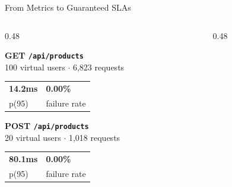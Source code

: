 \begin{frame}{From Metrics to Guaranteed SLAs}
    \vspace{0.2cm}
    \begin{columns}[T]
        
        \begin{column}{0.48\textwidth}
            \begin{tcolorbox}[colback=white, colframe=gray!30, arc=2pt, boxrule=0.5pt]
                \textbf{\large GET \texttt{/api/products}}\\[0.1cm]
                \tiny \textcolor{gray!80!black}{100 virtual users $\cdot$ 6,823 requests}\\[0.2cm]
                \begin{tabular}{@{}p{3.5cm} p{2cm}@{}}
                    \textcolor{teal!70!black}{\huge \textbf{14.2ms}} & \textcolor{green!60!black}{\scriptsize \textbf{0.00\%}} \\
                    \tiny p(95) & \tiny \textcolor{green!60!black}{failure rate}
                \end{tabular}
            \end{tcolorbox}
            \vspace{0.3cm}
            \begin{tcolorbox}[colback=white, colframe=gray!30, arc=2pt, boxrule=0.5pt]
                \textbf{\large POST \texttt{/api/products}}\\[0.1cm]
                \tiny \textcolor{gray!80!black}{20 virtual users $\cdot$ 1,018 requests}\\[0.2cm]
                \begin{tabular}{@{}p{3.5cm} p{2cm}@{}}
                    \textcolor{blue!70!black}{\huge \textbf{80.1ms}} & \textcolor{green!60!black}{\scriptsize \textbf{0.00\%}} \\
                    \tiny p(95) & \tiny \textcolor{green!60!black}{failure rate}
                \end{tabular}
            \end{tcolorbox}
        \end{column}
        
        \begin{column}{0.48\textwidth}
            \vspace{0.5cm} 
            \renewcommand{\arraystretch}{2}
            \begin{tabular}{@{}p{0.8cm} p{4.5cm}@{}}
                

\end{tabular}
\end{column}
\end{columns}
\end{frame}
